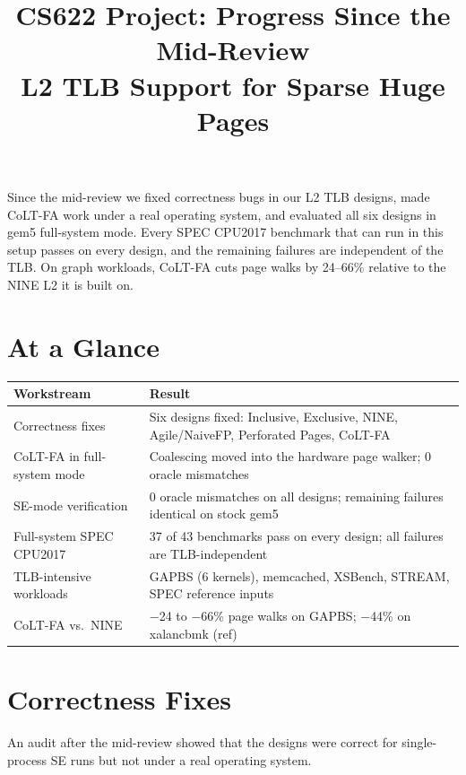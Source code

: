 \documentclass[11pt]{article}
\title{\textbf{CS622 Project: Progress Since the Mid-Review}\\[4pt]
\large L2 TLB Support for Sparse Huge Pages}
\date{}
\begin{document}
\maketitle

\noindent Since the mid-review we fixed correctness bugs in our L2 TLB designs, made CoLT-FA work under a real operating system, and evaluated all six designs in gem5 full-system mode. Every SPEC CPU2017 benchmark that can run in this setup passes on every design, and the remaining failures are independent of the TLB. On graph workloads, CoLT-FA cuts page walks by 24--66\% relative to the NINE L2 it is built on.

\section{At a Glance}
\begin{table}[H]
\centering
\begin{tabularx}{\textwidth}{@{}l L@{}}
\toprule
\textbf{Workstream} & \textbf{Result} \\
\midrule
Correctness fixes & Six designs fixed: Inclusive, Exclusive, NINE, Agile/NaiveFP, Perforated Pages, CoLT-FA \\
CoLT-FA in full-system mode & Coalescing moved into the hardware page walker; 0 oracle mismatches \\
SE-mode verification & 0 oracle mismatches on all designs; remaining failures identical on stock gem5 \\
Full-system SPEC CPU2017 & 37 of 43 benchmarks pass on every design; all failures are TLB-independent \\
TLB-intensive workloads & GAPBS (6 kernels), memcached, XSBench, STREAM, SPEC reference inputs \\
CoLT-FA vs.\ NINE & $-$24 to $-$66\% page walks on GAPBS; $-$44\% on xalancbmk (ref) \\
\bottomrule
\end{tabularx}
\end{table}

\section{Correctness Fixes}
An audit after the mid-review showed that the designs were correct for single-process SE runs but not under a real operating system.
\end{document}
